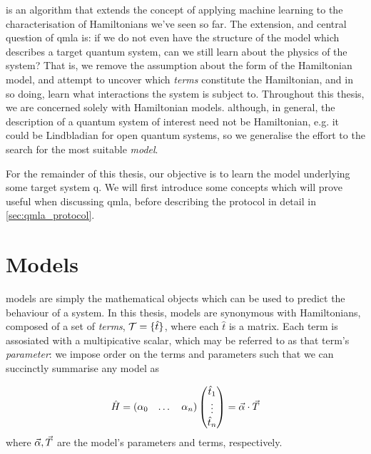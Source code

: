  is an algorithm that extends the concept of applying machine learning to the 
    characterisation of Hamiltonians we've seen so far. 
The extension, and central question of \gls{qmla} is:
    if we do not even have the structure of the model which describes a target quantum system, 
    can we still learn about the physics of the system?
That is, we remove the assumption about the form of the Hamiltonian model, 
    and attempt to uncover which \emph{\glspl{term}} constitute the Hamiltonian, 
    and in so doing, learn what interactions the system is subject to. 
Throughout this thesis, we are concerned solely with Hamiltonian models. 
    although, in general, the description of a quantum system of interest need not be Hamiltonian, 
    e.g. it could be Lindbladian for open quantum systems, 
    so we generalise the effort to the search for the most suitable \emph{\gls{model}}. 
\par 

For the remainder of this thesis, our objective is to learn the model underlying 
    some target system \gls{q}. 
We will first introduce some concepts which will prove useful when discussing \gls{qmla}, 
    before describing the protocol in detail in \cref{sec:qmla_protocol}.


\section{Models}\label{sec:models}
\Glspl{model} are simply the mathematical objects which can be used to predict the behaviour of a system. 
In this thesis, \glspl{model} are synonymous with Hamiltonians,
    composed of a set of \emph{\glspl{term}}, $\mathcal{T} = \{ \hat{t} \}$, 
    where each $\hat{t}$ is a matrix. 
Each term is assosiated with a multipicative scalar, which may be referred to as that term's \emph{parameter}: 
    we impose order on the terms and parameters such that we can succinctly summarise any model as 

\begin{align}
    \label{eqn:model}
    \begin{split}
        \hat{H} = \begin{matrix}(\alpha_0 & \dots & \alpha_n)\end{matrix} \left(\begin{matrix}\hat{t}_1 \\ \vdots \\ \hat{t}_n\end{matrix}\right) = \vec{\alpha} \cdot { \vec{T} } 
    \end{split}
\end{align}
    where $\vec{\alpha}, { \vec{T} }$ are the model's parameters and terms, respectively.

